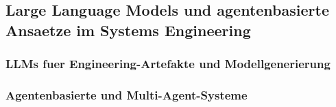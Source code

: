 \subsection{Large Language Models und agentenbasierte Ansaetze im Systems Engineering}
\label{sec:llm_mbse}

\subsubsection{LLMs fuer Engineering-Artefakte und Modellgenerierung}
\label{sec:llm_model_generation}

%
%
%
%
%
%
%
%


\subsubsection{Agentenbasierte und Multi-Agent-Systeme}
\label{sec:agentic_systems}

%
%
%
%
%
%
%
%
%
%


